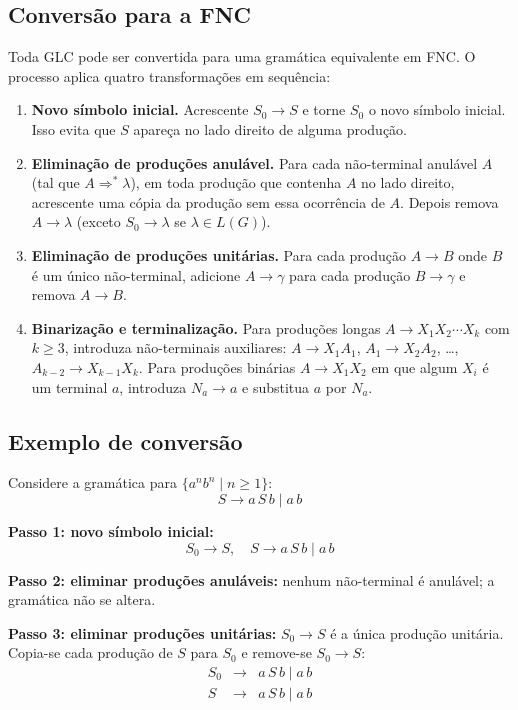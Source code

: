 \subsection{Conversão para a FNC}

Toda GLC pode ser convertida para uma gramática equivalente em FNC. O processo aplica quatro transformações em sequência:

\begin{enumerate}
  \item \textbf{Novo símbolo inicial.} Acrescente $S_0 \to S$ e torne $S_0$ o novo símbolo inicial. Isso evita que $S$ apareça no lado direito de alguma produção.

  \item \textbf{Eliminação de produções anulável.} Para cada não-terminal anulável $A$ (tal que $A \Rightarrow^* \lambda$), em toda produção que contenha $A$ no lado direito, acrescente uma cópia da produção sem essa ocorrência de $A$. Depois remova $A \to \lambda$ (exceto $S_0 \to \lambda$ se $\lambda \in L(G)$).

  \item \textbf{Eliminação de produções unitárias.} Para cada produção $A \to B$ onde $B$ é um único não-terminal, adicione $A \to \gamma$ para cada produção $B \to \gamma$ e remova $A \to B$.

  \item \textbf{Binarização e terminalização.} Para produções longas $A \to X_1 X_2 \cdots X_k$ com $k \geq 3$, introduza não-terminais auxiliares: $A \to X_1 A_1$, $A_1 \to X_2 A_2$, \ldots, $A_{k-2} \to X_{k-1} X_k$. Para produções binárias $A \to X_1 X_2$ em que algum $X_i$ é um terminal $a$, introduza $N_a \to a$ e substitua $a$ por $N_a$.
\end{enumerate}

\subsection{Exemplo de conversão}

Considere a gramática para $\{a^n b^n \mid n \geq 1\}$:
\[
  S \to a\,S\,b \mid a\,b
\]

\textbf{Passo 1: novo símbolo inicial:}
\[
  S_0 \to S, \quad S \to a\,S\,b \mid a\,b
\]

\textbf{Passo 2: eliminar produções anuláveis:} nenhum não-terminal é anulável; a gramática não se altera.

\textbf{Passo 3: eliminar produções unitárias:} $S_0 \to S$ é a única produção unitária. Copia-se cada produção de $S$ para $S_0$ e remove-se $S_0 \to S$:
\[
  \begin{array}{lcl}
    S_0 & \to & a\,S\,b \mid a\,b \\
    S   & \to & a\,S\,b \mid a\,b
  \end{array}
\]


